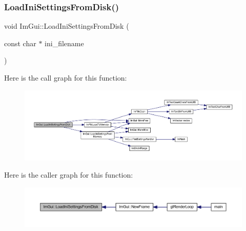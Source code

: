\mbox{\label{namespace_im_gui_a4bf22fb84ba768fc18383af50e8c217f}} 
\subsubsection{\texorpdfstring{Load\+Ini\+Settings\+From\+Disk()}{LoadIniSettingsFromDisk()}}
{\footnotesize\ttfamily void Im\+Gui\+::\+Load\+Ini\+Settings\+From\+Disk (\begin{DoxyParamCaption}\item[{const char $\ast$}]{ini\+\_\+filename }\end{DoxyParamCaption})}

Here is the call graph for this function\+:
\nopagebreak
\begin{figure}[H]
\begin{center}
\leavevmode
\includegraphics[width=350pt]{namespace_im_gui_a4bf22fb84ba768fc18383af50e8c217f_cgraph}
\end{center}
\end{figure}
Here is the caller graph for this function\+:
\nopagebreak
\begin{figure}[H]
\begin{center}
\leavevmode
\includegraphics[width=350pt]{namespace_im_gui_a4bf22fb84ba768fc18383af50e8c217f_icgraph}
\end{center}
\end{figure}
\mbox{\label{namespace_im_gui_a8e37b6a0b2feb6cd6ac61a4259392861}} 
